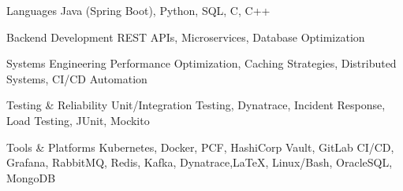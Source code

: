 
\begin{cvskills}
  \cvskill
    {Languages} %
    {Java (Spring Boot), Python, SQL, C, C++} %

  \cvskill
    {Backend Development} %
    {REST APIs, Microservices, Database Optimization} %

  \cvskill
    {Systems Engineering} %
    {Performance Optimization, Caching Strategies, Distributed Systems, CI/CD Automation} %

  \cvskill
    {Testing \& Reliability} %
    {Unit/Integration Testing, Dynatrace, Incident Response, Load Testing, JUnit, Mockito} %

  \cvskill
    {Tools \& Platforms} %
    {Kubernetes, Docker, PCF, HashiCorp Vault, GitLab CI/CD, Grafana, RabbitMQ, Redis, Kafka, Dynatrace,\LaTeX, Linux/Bash, OracleSQL, MongoDB} %


\end{cvskills}